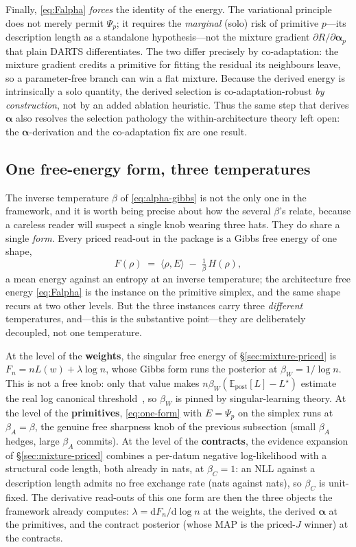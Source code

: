 \documentclass[11pt]{article}
\theoremstyle{definition}
\newcommand{\alphapar}{\bm{\alpha}}
\begin{document}
Finally, \eqref{eq:Falpha} \emph{forces} the identity of the energy. The variational principle does not
merely permit $\Psi_p$; it requires the \emph{marginal} (solo) risk of primitive $p$---its
description length as a standalone hypothesis---not the mixture gradient $\partial R/\partial\alphapar_p$
that plain DARTS differentiates. The two differ precisely by co-adaptation: the mixture gradient credits
a primitive for fitting the residual its neighbours leave, so a parameter-free branch can win a flat
mixture. Because the derived energy is intrinsically a solo quantity, the derived selection is
co-adaptation-robust \emph{by construction}, not by an added ablation heuristic. Thus the same step that
derives $\alphapar$ also resolves the selection pathology the within-architecture theory left open: the
$\alphapar$-derivation and the co-adaptation fix are one result.

\subsection{One free-energy form, three temperatures}
\label{sec:three-temperatures}
The inverse temperature $\beta$ of \eqref{eq:alpha-gibbs} is not the only one in the framework, and it is
worth being precise about how the several $\beta$'s relate, because a careless reader will suspect a single
knob wearing three hats. They do share a single \emph{form}. Every priced read-out in the package is a
Gibbs free energy of one shape,
\begin{equation}
\label{eq:one-form}
F(\rho)\;=\;\langle\rho,E\rangle\;-\;\tfrac{1}{\beta}\,H(\rho),
\end{equation}
a mean energy against an entropy at an inverse temperature; the architecture free energy \eqref{eq:Falpha}
is the instance on the primitive simplex, and the same shape recurs at two other levels. But the three
instances carry three \emph{different} temperatures, and---this is the substantive point---they are
deliberately decoupled, not one temperature.

At the level of the \textbf{weights}, the singular free energy of \S\ref{sec:mixture-priced} is
$F_n=nL(w)+\lambda\log n$, whose Gibbs form runs the posterior at $\beta_W=1/\log n$. This is not a free
knob: only that value makes $n\beta_W(\mathbb{E}_{\mathrm{post}}[L]-L^\star)$ estimate the real log canonical
threshold~\cite{watanabe2009slt,lau2023llc}, so $\beta_W$ is pinned by singular-learning theory. At the
level of the \textbf{primitives}, \eqref{eq:one-form} with $E=\Psi_p$ on the simplex runs at
$\beta_A=\beta$, the genuine free sharpness knob of the previous subsection (small $\beta_A$ hedges, large
$\beta_A$ commits). At the level of the \textbf{contracts}, the evidence expansion of \S\ref{sec:mixture-priced}
combines a per-datum negative log-likelihood with a structural code length, both already in nats, at
$\beta_C=1$: an NLL against a description length admits no free exchange rate (nats against nats), so
$\beta_C$ is unit-fixed. The derivative read-outs of this one form are then the three objects the framework
already computes: $\lambda=\mathrm{d}F_n/\mathrm{d}\log n$ at the weights, the derived $\alphapar$ at the
primitives, and the contract posterior (whose MAP is the priced-$J$ winner) at the contracts.
\end{document}
